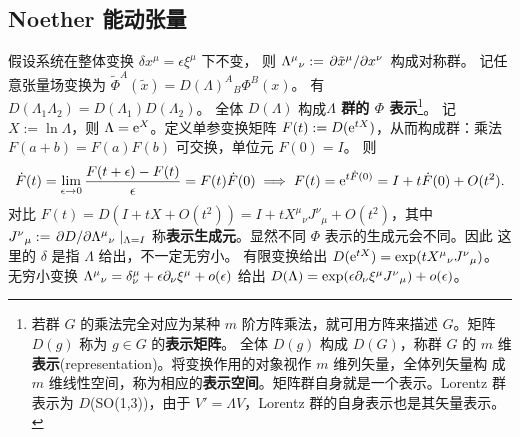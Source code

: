 \subsection{Noether 能动张量}

假设系统在整体变换 $\delta x^\mu=\epsilon\xi^\mu$ 下不变，
则 $\Lambda^\mu{}_\nu:=\pdv*{\tilde x^\mu}{x^\nu}$ 构成对称群。
记任意张量场变换为 $\tilde\Phi^A(\tilde x) = D(\Lambda)^A{}_B\Phi^B(x)$。
有 $D(\Lambda_1\Lambda_2)=D(\Lambda_1)D(\Lambda_2)$。
全体 $D(\Lambda)$ 构成\textbf{$\Lambda$ 群的 $\Phi$ 表示}\footnote{若群 $G$ 的乘法完全对应为某种 $m$ 阶方阵乘法，就可用方阵来描述 $G$。矩阵 $D(g)$ 称为 $g\in G$ 的\textbf{表示矩阵}。
全体 $D(g)$ 构成 $D(G)$，称群 $G$ 的 $m$ 维\textbf{表示}(representation)。将变换作用的对象视作 $m$ 维列矢量，全体列矢量构
成 $m$ 维线性空间，称为相应的\textbf{表示空间}。矩阵群自身就是一个表示。Lorentz 群表示为 $D$(SO(1,3))，由于 $V'=\Lambda V$，Lorentz 群的自身表示也是其矢量表示。}。
记 $X:=\ln\Lambda$，则 $\Lambda=\mathrm{e}^X$。定义单参变换矩阵 $F(t):=D(\mathrm{e}^{tX})$，从而构成群：乘法 $F(a+b) = F(a) F(b)$ 可交换，单位元 $F(0) = I$。
则
\[
    \dot F(t) = \lim_{\epsilon\to 0}\frac{F(t+\epsilon)-F(t)}{\epsilon} = F(t) \dot F(0) \implies F(t) = \mathrm{e}^{t\dot F(0)} = I + t\dot F(0) + O(t^2).
\]
对比 $F(t) = D(I + t X + O(t^2)) = I + t X^\mu{}_\nu J^\nu{}_\mu + O(t^2)$，其中 $J^\nu{}_\mu:=\pdv*{D}{\Lambda^\mu{}_\nu}|_{\Lambda=I}$ 称\textbf{表示生成元}。显然不同 $\Phi$ 表示的生成元会不同。因此
这里的 $\delta$ 是指 $\Lambda$ 给出，不一定无穷小。
有限变换给出 $D(\mathrm{e}^{tX}) = \exp(tX^\mu{}_\nu J^\nu{}_\mu)$。
无穷小变换 $\Lambda^\mu{}_\nu = \delta^\mu_\nu + \epsilon\partial_\nu\xi^\mu + o(\epsilon)$ 给出  $D(\Lambda) = \exp(\epsilon\partial_\nu\xi^\mu J^\nu{}_\mu) + o(\epsilon)$。

